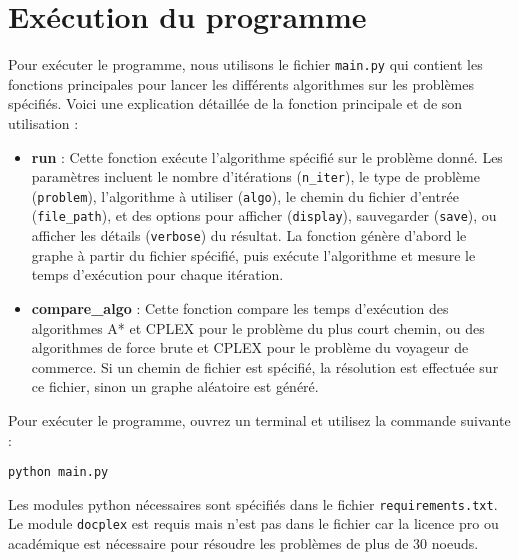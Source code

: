 \section{Exécution du programme}
Pour exécuter le programme, nous utilisons le fichier \texttt{main.py} qui contient les fonctions principales pour lancer les différents algorithmes sur les problèmes spécifiés. Voici une explication détaillée de la fonction principale et de son utilisation :

\begin{itemize}
    \item \textbf{run} : Cette fonction exécute l'algorithme spécifié sur le problème donné. Les paramètres incluent le nombre d'itérations (\texttt{n\_iter}), le type de problème (\texttt{problem}), l'algorithme à utiliser (\texttt{algo}), le chemin du fichier d'entrée (\texttt{file\_path}), et des options pour afficher (\texttt{display}), sauvegarder (\texttt{save}), ou afficher les détails (\texttt{verbose}) du résultat. La fonction génère d'abord le graphe à partir du fichier spécifié, puis exécute l'algorithme et mesure le temps d'exécution pour chaque itération.
    \item \textbf{compare\_algo} : Cette fonction compare les temps d'exécution des algorithmes A* et CPLEX pour le problème du plus court chemin, ou des algorithmes de force brute et CPLEX pour le problème du voyageur de commerce. Si un chemin de fichier est spécifié, la résolution est effectuée sur ce fichier, sinon un graphe aléatoire est généré.
\end{itemize}

Pour exécuter le programme, ouvrez un terminal et utilisez la commande suivante :

\begin{verbatim}
python main.py
\end{verbatim}

Les modules python nécessaires sont spécifiés dans le fichier \texttt{requirements.txt}. Le module \texttt{docplex} est requis mais n'est pas dans le fichier car la licence pro ou académique est nécessaire pour résoudre les problèmes de plus de 30 noeuds.